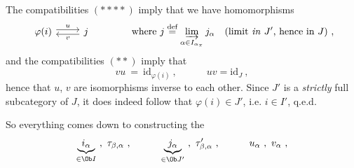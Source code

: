\noindent The compatibilities $(****)$ imply that we have homomorphisms
\[
\begin{tikzcd}
\varphi(i) \arrow[r, shift left, "u"] & j \arrow[l, shift left, "v"]
\end{tikzcd}
\qquad\qquad \text{where } j \overset{\text{def}}{=} \varinjlim_{\alpha\in I_{\alpha_\pi}} j_\alpha \quad \text{(limit \textit{in} $J'$, hence in $J$)} \ ,
\]
and the compatibilities $(**)$ imply that
\[
vu \ = \ \mathrm{id}_{\varphi(i)} \ , \qquad\quad uv = \mathrm{id}_J \ , %
\]
hence that $u$, $v$ are isomorphisms inverse to each other. Since $J'$ is a \textit{strictly} full subcategory of $J$, it does indeed follow that $\varphi(i) \in J'$, i.e. $i \in I'$, q.e.d.

So everything comes down to constructing the
\[
\underbrace{i_\alpha}_{\in \Ob I} \ , \ \tau_{\beta,\alpha} \ , \qquad\quad \underbrace{j_\alpha}_{\in \Ob J'} \ , \ \tau'_{\beta,\alpha} \ , \qquad\quad u_\alpha \ , \ v_\alpha \ ,
\]